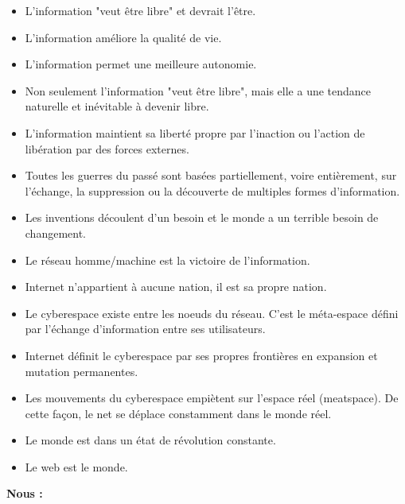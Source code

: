 \documentclass[11pt,twoside,a4paper]{book}
\begin{document}
\begin{multicols*}{2}
\begin{itemize}
		\item L'information "veut {\^e}tre libre" et devrait l'{\^e}tre.
		\item L'information am{\'e}liore la qualit{\'e} de vie.
		\item L'information permet une meilleure autonomie.
		\item Non seulement l'information "veut {\^e}tre libre", mais elle a une tendance naturelle et in{\'e}vitable {\`a} devenir libre.
		\item L'information maintient sa libert{\'e} propre par l'inaction ou l'action de lib{\'e}ration par des forces externes.
		\item Toutes les guerres du pass{\'e} sont bas{\'e}es partiellement, voire enti{\`e}rement, sur l'{\'e}change, la suppression ou la d{\'e}couverte de multiples formes d'information.
		\item Les inventions d{\'e}coulent d'un besoin et le monde a un terrible besoin de changement.
		\item Le r{\'e}seau homme/machine est la victoire de l'information.
		\item Internet n'appartient {\`a} aucune nation, il est sa propre nation.
		\item Le cyberespace existe entre les noeuds du r{\'e}seau. C'est le m{\'e}ta-espace d{\'e}fini par l'{\'e}change d'information entre ses utilisateurs.
		\item Internet d{\'e}finit le cyberespace par ses propres fronti{\`e}res en expansion et mutation permanentes.
		\item Les mouvements du cyberespace empi{\`e}tent sur l'espace r{\'e}el (meatspace). De cette fa\c{c}on, le net se d{\'e}place constamment dans le monde r{\'e}el.
		\item Le monde est dans un {\'e}tat de r{\'e}volution constante.
		\item Le web est le monde.
	\end{itemize} %
	
\vfill
\columnbreak
	
	\textbf{Nous :}
	\begin{itemize}
		\setlength{\itemsep}{1pt}
		\setlength{\parskip}{0pt}
		\setlength{\parsep}{0pt}
	

\end{itemize}
\end{multicols*}
\end{document}
